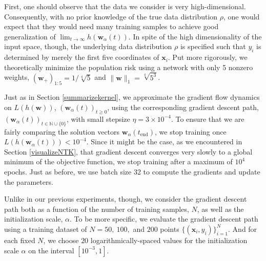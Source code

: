 \documentclass{article}
\begin{document}
First, one should observe that the data we consider is very high-dimensional. Consequently, with no prior knowledge of the true data distribution $\rho$, one would expect that they would need many training samples to achieve good generalization of $\lim_{t \to \infty} h(\boldsymbol{w}_{\alpha}(t))$. In spite of the high dimensionality of the input space, though, the underlying data distribution $\rho$ is specified such that $y_i$ is determined by merely the first five coordinates of $\boldsymbol{x}_i$. Put more rigorously, we theoretically minimize the population risk using a network with only 5 nonzero weights, $(\boldsymbol{w}_+)_{1:5} = 1/\sqrt[4]{5}$ and $\| \boldsymbol{w} \|_1 = \sqrt[4]{5^3}$.

Just as in Section \ref{summarizekernel}, we approximate the gradient flow dynamics on $L(h(\boldsymbol{w}))$, $(\boldsymbol{w}_{\alpha}(t))_{t \geq 0}$, using the corresponding gradient descent path, $(\boldsymbol{w}_{\alpha}(t))_{t \in \mathbb{N} \cup \{ 0\}}$, with small stepsize $\eta = 3 \times 10^{-4}$. To ensure that we are fairly comparing the solution vectors $\boldsymbol{w}_{\alpha}(t_{\text{end}})$, we stop training once $L(h(\boldsymbol{w}_{\alpha}(t))) < 10^{-4}$. Since it might be the case, as we encountered in Section \ref{visualizeNTK}, that gradient descent converges very slowly to a global minimum of the objective function, we stop training after a maximum of $10^4$ epochs. Just as before, we use batch size 32 to compute the gradients and update the parameters.

Unlike in our previous experiments, though, we consider the gradient descent path both as a function of the number of training samples, $N$, as well as the initialization scale, $\alpha$. To be more specific, we evaluate the gradient descent path using a training dataset of $N = 50, \ 100,$ and $200$ points $\{ (\boldsymbol{x}_i, y_i) \}_{i=1}^N$. And for each fixed $N$, we choose $20$ logarithmically-spaced values for the initialization scale $\alpha$ on the interval $[10^{-3}, 1]$.
\end{document}

